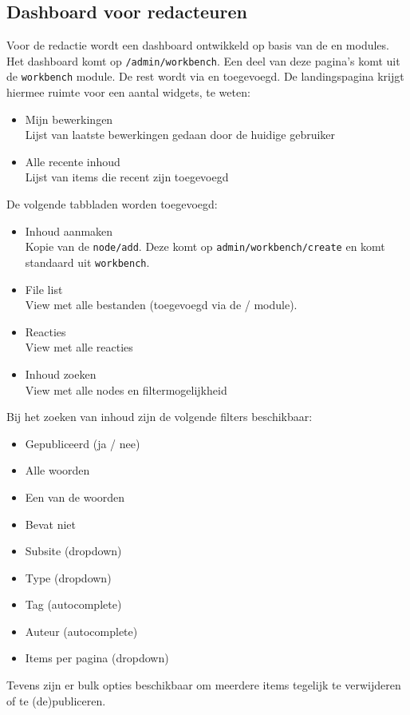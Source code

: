 \subsection{Dashboard voor redacteuren}\label{workbenchdashboard}

Voor de redactie wordt een dashboard ontwikkeld op basis van de  en  modules. Het dashboard komt op \texttt{/admin/workbench}. Een deel van deze pagina's komt uit de \texttt{workbench} module. De rest wordt via  en  toegevoegd. De landingspagina krijgt hiermee ruimte voor een aantal widgets, te weten:
\begin{itemize}
\item Mijn bewerkingen \\ Lijst van laatste bewerkingen gedaan door de huidige gebruiker
\item Alle recente inhoud \\ Lijst van items die recent zijn toegevoegd
\end{itemize}
De volgende tabbladen worden toegevoegd:
\begin{itemize}
\item Inhoud aanmaken \\ Kopie van de \texttt{node/add}. Deze komt op \texttt{admin/workbench/create} en komt standaard uit \texttt{workbench}.
\item File list \\ View met alle bestanden (toegevoegd via de  /  module).
\item Reacties \\ View met alle reacties
\item Inhoud zoeken \\ View met alle nodes en filtermogelijkheid
\end{itemize}
Bij het zoeken van inhoud zijn de volgende filters beschikbaar:
\begin{itemize}
\item Gepubliceerd (ja / nee)
\item Alle woorden
\item Een van de woorden
\item Bevat niet
\item Subsite (dropdown)
\item Type (dropdown)
\item Tag (autocomplete)
\item Auteur (autocomplete)
\item Items per pagina (dropdown)
\end{itemize}
Tevens zijn er bulk opties beschikbaar om meerdere items tegelijk te verwijderen of te (de)publiceren.
